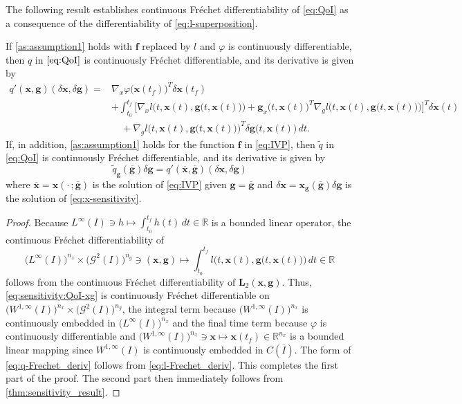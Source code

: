 \documentclass[onefignum,onetabnum]{siamart220329}
\numberwithin{equation}{section}
\newcommand {\real} {\mathbb{R}}
\newcommand{\bff}{\ensuremath{\mathbf{f}}} %
\newcommand{\bg}{\ensuremath{\mathbf{g}}} %
\newcommand{\bx}{\ensuremath{\mathbf{x}}} %
\newcommand{\BL}{\ensuremath{\mathbf{L}} } %
\newcommand {\cG} {\mathcal{G}}
\newcommand{\WW}{\big( W^{1, \infty}(I) \big)^{n_x}}
\newcommand{\LL}{\big(L^\infty(I) \big)^{n_x}}
\begin{document}
The following result establishes continuous Fr\'echet differentiability of \cref{eq:QoI} as a consequence of the differentiability of \cref{eq:l-superposition}.
\begin{theorem} \label{thm:sensitivity_result_qoi}
	If \cref{as:assumption1} holds with $\bff$ replaced by $l$ and $\varphi$ is continuously differentiable,
	then $q$ in $\cref{eq:QoI}$ is continuously Fr\'echet differentiable, and its derivative is given by
	\begin{align} \label{eq:q-Frechet_deriv}
		q'(\bx, \bg) (\delta \bx, \delta \bg) 
		= & \nabla_x \varphi \big( \bx(t_f) \big)^T \delta \bx(t_f)   \nonumber \\
		 & + \int_{t_0}^{t_f} \Big[ \nabla_x l\Big( t, \bx(t), \bg\big(t, \bx(t) \big) \Big) 
	                                             + \bg_x\big(t, \bx(t) \big)^T \nabla_g l\Big( t, \bx(t), \bg\big(t, \bx(t) \big) \Big) \Big]^T \delta \bx(t) \nonumber \\
	          &\quad +  \nabla_g l\Big( t, \bx(t), \bg\big( t,  \bx(t) \big) \Big)^T \delta \bg\big(t,  \bx(t) \big) \, dt.
	\end{align}
	If, in addition, \cref{as:assumption1} holds for the function $\bff$ in \cref{eq:IVP}, then $\widetilde{q}$ in \cref{eq:QoI} is continuously Fr\'echet differentiable, and its derivative is given by
	\[
	\widetilde{q}_\bg(\overline{\bg}) \delta \bg = q'(\overline{\bx}, \overline{\bg}) (\delta \bx, \delta \bg)
	\]
	where $\overline{\bx} = \bx(\cdot \, ; \overline{\bg})$ is the solution of \cref{eq:IVP} given $\bg = \overline{\bg}$
	and $\delta \bx = \bx_\bg(\overline{\bg}) \delta \bg$ is the solution of \cref{eq:x-sensitivity}.
\end{theorem}
\begin{proof}
    Because $L^\infty(I) \ni h \mapsto \int_{t_0}^{t_f} h(t) \, dt \in \real$ is a bounded linear operator, the continuous Fr\'echet differentiability of
    \[
    	\LL \times \big(\cG^2(I)\big)^{n_g} \ni (\bx, \bg) \mapsto \int_{t_0}^{t_f} l\Big(t, \bx(t), \bg\big(t, \bx(t)\big)\Big) \, dt \in \real
    \]
   follows from the continuous Fr\'echet differentiability of $\BL_2(\bx, \bg)$. 
   Thus, \cref{eq:sensitivity:QoI-xg} is continuously Fr\'echet differentiable on $\WW \times \big(\cG^2(I)\big)^{n_g}$, 
   the integral term because $\WW$ is continuously embedded in $\LL$ and the final time term because $\varphi$ is 
   continuously differentiable and $\WW \ni \bx \mapsto \bx(t_f) \in \real^{n_x}$ is a bounded linear mapping since 
   $W^{1, \infty}(I)$ is continuously embedded in $C(\overline{I})$. 
   The form of \cref{eq:q-Frechet_deriv} follows from \cref{eq:l-Frechet_deriv}. This completes the first part of the proof. 
    The second part then immediately follows from \cref{thm:sensitivity_result}.
\end{proof}
\end{document}
